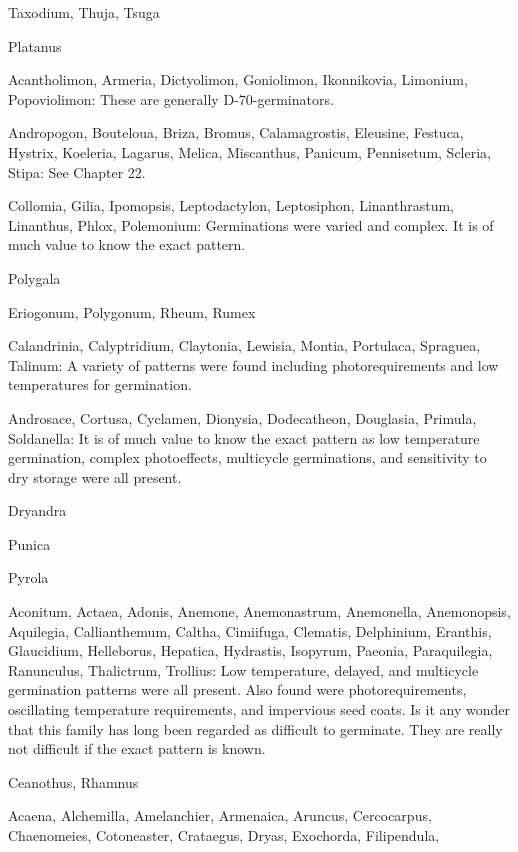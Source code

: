 \begin{description}
Taxodium, Thuja, Tsuga
\item[Platanaceae] Platanus
\item[Plumbaginaceae] Acantholimon, Armeria, Dictyolimon, Goniolimon,
Ikonnikovia, Limonium, Popoviolimon: These are generally D-70-germinators.
\item[Poaceae (Graminae)] Andropogon, Bouteloua, Briza, Bromus,
Calamagrostis, Eleusine, Festuca, Hystrix, Koeleria, Lagarus, Melica, Miscanthus,
Panicum, Pennisetum, Scleria, Stipa: See Chapter 22.
\item[Polemoniaceae] Collomia, Gilia, Ipomopsis, Leptodactylon, Leptosiphon,
Linanthrastum, Linanthus, Phlox, Polemonium: Germinations were varied and
complex. It is of much value to know the exact pattern.
\item[Polygalaceae] Polygala
\item[Polygonaceae] Eriogonum, Polygonum, Rheum, Rumex
\item[Portulacaceae] Calandrinia, Calyptridium, Claytonia, Lewisia, Montia,
Portulaca, Spraguea, Talinum: A variety of patterns were found including
photorequirements and low temperatures for germination.
\item[Primulaceae] Androsace, Cortusa, Cyclamen, Dionysia, Dodecatheon,
Douglasia, Primula, Soldanella: It is of much value to know the exact pattern as low
temperature germination, complex photoeffects, multicycle germinations, and
sensitivity to dry storage were all present.
\item[Proteaceae] Dryandra
\item[Puniceae] Punica
\item[Pyrolaceae] Pyrola
\item[Ranunculaceae] Aconitum, Actaea, Adonis, Anemone, Anemonastrum,
Anemonella, Anemonopsis, Aquilegia, Callianthemum, Caltha, Cimiifuga, Clematis,
Delphinium, Eranthis, Glaucidium, Helleborus, Hepatica, Hydrastis, Isopyrum,
Paeonia, Paraquilegia, Ranunculus, Thalictrum, Trollius: Low temperature, delayed,
and multicycle germination patterns were all present. Also found were
photorequirements, oscillating temperature requirements, and impervious seed coats.
Is it any wonder that this family has long been regarded as difficult to germinate. They
are really not difficult if the exact pattern is known.
\item[Rhamnaceae] Ceanothus, Rhamnus
\item[Rosaceae] Acaena, Alchemilla, Amelanchier, Armenaica, Aruncus,
Cercocarpus, Chaenomeies, Cotoneaster, Crataegus, Dryas, Exochorda, Filipendula,

\end{description}

